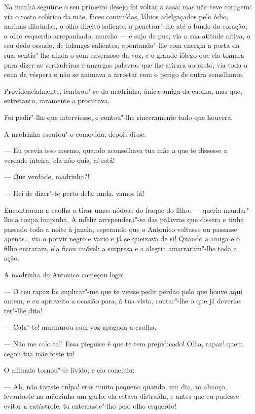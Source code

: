 Na manhã seguinte o seu primeiro desejo foi voltar a casa; mas não teve
coragem: via o rosto colérico da mãe, faces contraídas, lábios
adelgaçados pelo ódio, narinas dilatadas, o olho direito saliente, a
penetrar"-lhe até o fundo do coração, o olho esquerdo arrepanhado, murcho
--- e sujo de pus; via a sua atitude altiva, o seu dedo ossudo, de
falanges salientes, apontando"-lhe com energia a porta da rua; sentia"-lhe
ainda o som cavernoso da voz, e o grande fôlego que ela tomara para
dizer as verdadeiras e amargas palavras que lhe atirara ao rosto; via
toda a cena da véspera e não se animava a arrostar com o perigo de outra
semelhante.

Providencialmente, lembrou"-se da madrinha, única amiga da caolha, mas
que, entretanto, raramente a procurava.

Foi pedir"-lhe que interviesse, e contou"-lhe sinceramente tudo que
houvera.

A madrinha escutou"-o comovida; depois disse:

--- Eu previa isso mesmo, quando aconselhava tua mãe a que te dissesse a
verdade inteira; ela não quis, aí está!

--- Que verdade, madrinha?!

--- Hei de dizer"-te perto dela; anda, vamos lá!

Encontraram a caolha a tirar umas nódoas do fraque do filho, --- queria
mandar"-lhe a roupa limpinha. A infeliz arrependera"-se das palavras que
dissera e tinha passado toda a noite à janela, esperando que o Antonico
voltasse ou passasse apenas\ldots{} via o porvir negro e vazio e já se
queixava de si! Quando a amiga e o filho entraram, ela ficou imóvel: a
surpresa e a alegria amarraram"-lhe toda a ação.

A madrinha do Antonico começou logo:

--- O teu rapaz foi suplicar"-me que te viesse pedir perdão pelo que
houve aqui ontem, e eu aproveito a ocasião para, à tua vista, contar"-lhe
o que já deverias ter"-lhe dito!

--- Cala"-te! murmurou com voz apagada a caolha.

--- Não me calo tal! Essa pieguice é que te tem prejudicado! Olha,
rapaz! quem cegou tua mãe foste tu!

O afilhado tornou"-se lívido; e ela concluiu:

--- Ah, não tiveste culpa! eras muito pequeno quando, um dia, ao almoço,
levantaste na mãozinha um garfo; ela estava distraída, e antes que eu
pudesse evitar a catástrofe, tu enterraste"-lho pelo olho esquerdo!

